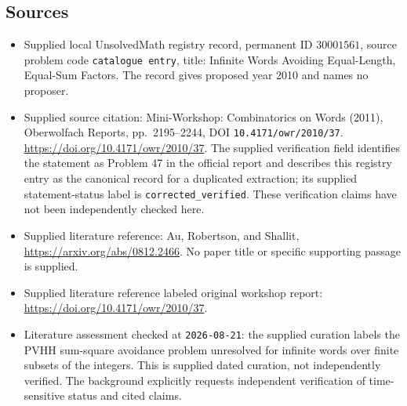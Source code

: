 \documentclass[11pt]{article}
\begin{document}
\subsection{Sources}
\begin{itemize}
\item Supplied local UnsolvedMath registry record, permanent ID \(30001561\), source problem code \texttt{catalogue entry}, title: Infinite Words Avoiding Equal-Length, Equal-Sum Factors. The record gives proposed year 2010 and names no proposer.
\item Supplied source citation: Mini-Workshop: Combinatorics on Words (2011), Oberwolfach Reports, pp.\ 2195--2244, DOI \texttt{10.4171/owr/2010/37}. \url{https://doi.org/10.4171/owr/2010/37}. The supplied verification field identifies the statement as Problem 47 in the official report and describes this registry entry as the canonical record for a duplicated extraction; its supplied statement-status label is \texttt{corrected\_verified}. These verification claims have not been independently checked here.
\item Supplied literature reference: Au, Robertson, and Shallit, \url{https://arxiv.org/abs/0812.2466}. No paper title or specific supporting passage is supplied.
\item Supplied literature reference labeled original workshop report: \url{https://doi.org/10.4171/owr/2010/37}.
\item Literature assessment checked at \texttt{2026-08-21}: the supplied curation labels the PVHH sum-square avoidance problem unresolved for infinite words over finite subsets of the integers. This is supplied dated curation, not independently verified. The background explicitly requests independent verification of time-sensitive status and cited claims.
\end{itemize}
\end{document}

